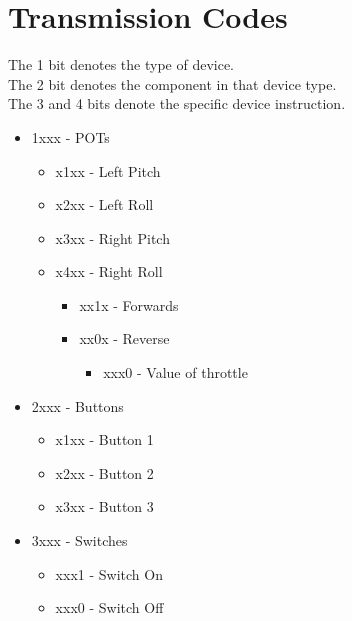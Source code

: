 \documentclass [11pt]{article}
\begin{document}
\section{Transmission Codes}\label{app:transmission_codes}
{\parindent0pt
The 1 bit denotes the type of device.\\
The 2 bit denotes the component in that device type.\\
The 3 and 4 bits denote the specific device instruction.\\
}
\begin{itemize}
\item 1xxx - POTs
    \begin{itemize}
        \item x1xx - Left Pitch
        \item x2xx - Left Roll
	    \item x3xx - Right Pitch
		\item x4xx - Right Roll
		\begin{itemize}
			\item xx1x - Forwards
			\item xx0x - Reverse
			\begin{itemize}
				\item xxx0 - Value of throttle
			\end{itemize}
		\end{itemize}
     \end{itemize}
\item 2xxx - Buttons
	\begin{itemize}
		\item x1xx - Button 1
		\item x2xx - Button 2
		\item x3xx - Button 3
	\end{itemize}
\item 3xxx - Switches
	\begin{itemize}
		\item xxx1 - Switch On
		\item xxx0 - Switch Off
	\end{itemize}
\end{itemize}
\end{document}
